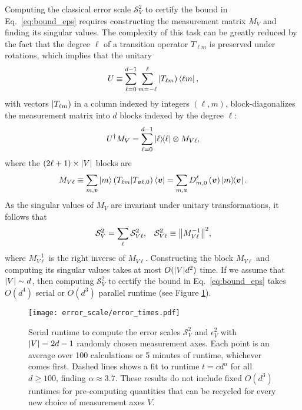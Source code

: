 \documentclass[notitlepage,twocolumn]{revtex4-2}
\newcommand{\p}[1]{\left(#1\right)} %
\renewcommand{\v}{\bm} %
\renewcommand{\S}{\mathcal{S}}
\def\oket#1{\mathinner{|{#1})}}
\def\obk#1{\mathinner{({#1})}}
\newcommand{\1}{\mathds{1}}
\begin{document}
Computing the classical error scale $\S_V^2$ to certify the bound in Eq.~\eqref{eq:bound_eps} requires constructing the measurement matrix $M_V$ and finding its singular values.
The complexity of this task can be greatly reduced by the fact that the degree $\ell$ of a transition operator $T_{\ell m}$ is preserved under rotations, which implies that the unitary
\begin{align}
  U \equiv \sum_{\ell=0}^{d-1} \sum_{m=-\ell}^\ell
  \oket{T_{\ell m}} \bra{\ell m},
  \label{eq:trans_basis}
\end{align}
with vectors $\oket{T_{\ell m}}$ in a column indexed by integers $\p{\ell,m}$, block-diagonalizes the measurement matrix into $d$ blocks indexed by the degree $\ell$:
\begin{align}
  U^\dag M_V = \sum_{\ell=0}^{d-1} \op{\ell} \otimes M_{V\ell},
\end{align}
where the $\p{2\ell+1}\times\abs{V}$ blocks are
\begin{align}
  M_{V\ell} \equiv \sum_{m,\v v} \ket{m} \obk{T_{\ell m}|T_{\v v\ell,0}} \bra{\v v}
  = \sum_{m,\v v} D^\ell_{m,0}\p{\v v} \op{m}{\v v}.
\end{align}
As the singular values of $M_V$ are invariant under unitary transformations, it follows that
\begin{align}
  \S_V^2 = \sum_\ell \S_{V\ell}^2,
  &&
  \S_{V\ell}^2 \equiv \norm{M_{V\ell}^{-1}}^2,
\end{align}
where $M_{V\ell}^{-1}$ is the right inverse of $M_{V\ell}$.
Constructing the block $M_{V\ell}$ and computing its singular values takes at most $O(\abs{V}d^2)$ time.
If we assume that $\abs{V}\sim d$, then computing $\S_V^2$ to certify the bound in Eq.~\eqref{eq:bound_eps} takes $O(d^4)$ serial or $O(d^3)$ parallel runtime (see Figure \ref{fig:times}).

\begin{figure}
  \centering
  \texttt{[image: error\_scale/error\_times.pdf]}
  \caption{Serial runtime to compute the error scales $\S_V^2$ and $\epsilon_V^2$ with $\abs{V}=2d-1$ randomly chosen measurement axes.
    Each point is an average over 100 calculations or 5 minutes of runtime, whichever comes first.
    Dashed lines shows a fit to runtime $t=c d^\alpha$ for all $d\ge100$, finding $\alpha\approx 3.7$.
    These results do not include fixed $O(d^3)$ runtimes for pre-computing quantities that can be recycled for every new choice of measurement axes $V$.}
  \label{fig:times}
\end{figure}
\end{document}

